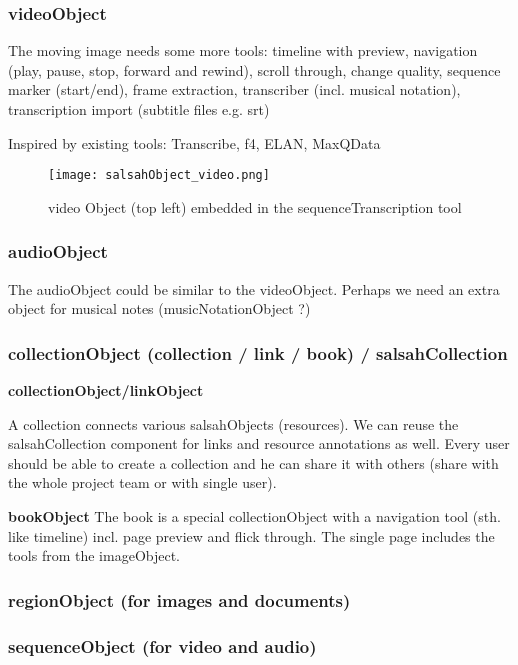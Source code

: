 \subsubsection{videoObject}
The moving image  needs some more tools:
timeline with preview, navigation (play, pause, stop, forward and rewind), scroll through, change quality, sequence marker (start/end), frame extraction, transcriber (incl. musical notation), transcription import (subtitle files e.g. srt)

Inspired by existing tools: Transcribe, f4, ELAN, MaxQData

\begin{figure}[!h]
    \centering
    \texttt{[image: salsahObject\_video.png]}
    \caption{video Object (top left) embedded in the sequenceTranscription tool}
\end{figure}

\subsubsection{audioObject}

The audioObject could be similar to the videoObject. Perhaps we need an extra object for musical notes (musicNotationObject ?)


\subsubsection{collectionObject (collection / link / book) / salsahCollection}

\textbf{collectionObject/linkObject}

A collection connects various salsahObjects (resources). We can reuse the salsahCollection component for links and resource annotations as well. Every user should be able to create a collection and he can share it with others (share with the whole project team or with single user).


\textbf{bookObject}
The book is a special collectionObject with a navigation tool (sth. like timeline) incl. page preview and flick through. The single page includes the tools from the imageObject.



\subsubsection{regionObject (for images and documents)}


\subsubsection{sequenceObject (for video and audio)}

